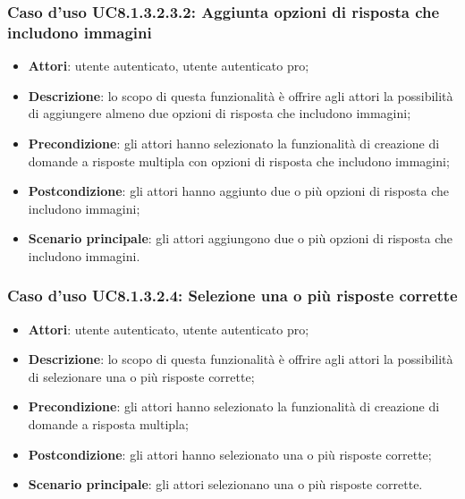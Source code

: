 \subsubsection{Caso d'uso UC8.1.3.2.3.2: Aggiunta opzioni di risposta che includono immagini}
	\begin{itemize}
		\item
			\textbf{Attori}: utente autenticato, utente autenticato pro;
		\item		
			\textbf{Descrizione}: lo scopo di questa funzionalità è offrire agli attori la possibilità di aggiungere almeno due opzioni di risposta che includono immagini;
		\item
			\textbf{Precondizione}: gli attori hanno selezionato la funzionalità di creazione di domande a risposte multipla con opzioni di risposta che includono immagini; 
		\item
			\textbf{Postcondizione}: gli attori hanno aggiunto due o più opzioni di risposta che includono immagini;
		\item
			\textbf{Scenario principale}: gli attori aggiungono due o più opzioni di risposta che includono immagini. 			
	\end{itemize}
	
\subsubsection{Caso d'uso UC8.1.3.2.4: Selezione una o più risposte corrette}
	\begin{itemize}
		\item
			\textbf{Attori}: utente autenticato, utente autenticato pro;
		\item		
			\textbf{Descrizione}: lo scopo di questa funzionalità è offrire agli attori la possibilità di selezionare una o più risposte corrette;
		\item
			\textbf{Precondizione}: gli attori hanno selezionato la funzionalità di creazione di domande a risposta multipla; 
		\item
			\textbf{Postcondizione}: gli attori hanno selezionato una o più risposte corrette;
		\item
			\textbf{Scenario principale}: gli attori selezionano una o più risposte corrette. 			
	\end{itemize}

	
	
	
	
	
	
	